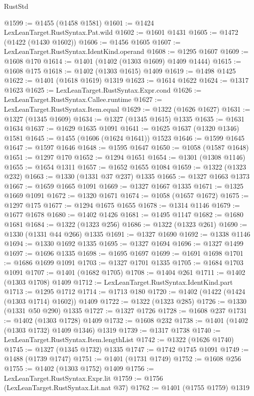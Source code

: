 \begin{lexlean}{RustStd}
\begin{coremodule}
@1599 := @1455 (@1458 @1581)
@1601 := @1424 LexLeanTarget.RustSyntax.Pat.wild
@1602 := @1601 @1431
@1605 := @1472 (@1422 (@1430 @1602))
@1606 := @1456 @1605
@1607 := LexLeanTarget.RustSyntax.IdentKind.operand
@1608 := @1295 @1607
@1609 := @1608 @170
@1614 := @1401 (@1402 (@1303 @1609) @1409 @1444)
@1615 := @1608 @175
@1618 := @1402 (@1303 @1615) @1409
@1619 := @1498 @1425
@1622 := @1401 (@1618 @1619) @1319
@1623 := @1614 @1622
@1624 := @1317 @1623
@1625 := LexLeanTarget.RustSyntax.Expr.cond
@1626 := LexLeanTarget.RustSyntax.Callee.runtime
@1627 := LexLeanTarget.RustSyntax.Item.equal
@1629 := @1322 (@1626 @1627)
@1631 := @1327 (@1345 @1609)
@1634 := @1327 (@1345 @1615) @1335
@1635 := @1631 @1634
@1637 := @1629 @1635 @1091
@1641 := @1625 @1637 (@1320 @1346) @1581
@1645 := @1455 (@1606 (@1624 @1641)) @1523
@1646 := @1599 @1645
@1647 := @1597 @1646
@1648 := @1595 @1647
@1650 := @1058 (@1587 @1648)
@1651 := @1297 @170
@1652 := @1294 @1651
@1654 := @1301 (@1308 @1146)
@1655 := @1654 @1311
@1657 := @1652 @1655 @1084
@1659 := @1322 (@1323 @232)
@1663 := @1330 (@1331 @37 @237) @1335
@1665 := @1327 @1663 @1373
@1667 := @1659 @1665 @1091
@1669 := @1327 @1667 @1335
@1671 := @1325 @1669 @1091
@1672 := @1320 @1671
@1674 := @1058 (@1657 @1672)
@1675 := @1297 @175
@1677 := @1294 @1675 @1655
@1678 := @1314 @1146
@1679 := @1677 @1678
@1680 := @1402 @1426
@1681 := @1495 @1147
@1682 := @1680 @1681
@1684 := @1322 (@1323 @256)
@1686 := @1322 (@1323 @261)
@1690 := @1330 (@1331 @44 @266) @1335
@1691 := @1327 @1690
@1692 := @1338 @1146
@1694 := @1330 @1692 @1335
@1695 := @1327 @1694
@1696 := @1327 @1499
@1697 := @1696 @1335
@1698 := @1695 @1697
@1699 := @1691 @1698
@1701 := @1686 @1699 @1091
@1703 := @1327 @1701 @1335
@1705 := @1684 @1703 @1091
@1707 := @1401 (@1682 @1705)
@1708 := @1404 @261
@1711 := @1402 (@1303 @1708) @1409
@1712 := LexLeanTarget.RustSyntax.IdentKind.part
@1713 := @1295 @1712
@1714 := @1713 @180
@1720 := @1402 (@1422 (@1424 (@1303 @1714) @1602)) @1409
@1722 := @1322 (@1323 @285)
@1726 := @1330 (@1331 @50 @290) @1335
@1727 := @1327 @1726
@1728 := @1608 @237
@1731 := @1402 (@1303 @1728) @1409
@1732 := @1608 @232
@1738 := @1401 (@1402 (@1303 @1732) @1409 @1346) @1319
@1739 := @1317 @1738
@1740 := LexLeanTarget.RustSyntax.Item.lengthList
@1742 := @1322 (@1626 @1740)
@1745 := @1327 (@1345 @1732) @1335
@1747 := @1742 @1745 @1091
@1749 := @1488 (@1739 @1747)
@1751 := @1401 (@1731 @1749)
@1752 := @1608 @256
@1755 := @1402 (@1303 @1752) @1409
@1756 := LexLeanTarget.RustSyntax.Expr.lit
@1759 := @1756 (LexLeanTarget.RustSyntax.Lit.nat @37)
@1762 := @1401 (@1755 @1759) @1319

\end{coremodule}
\end{lexlean}
